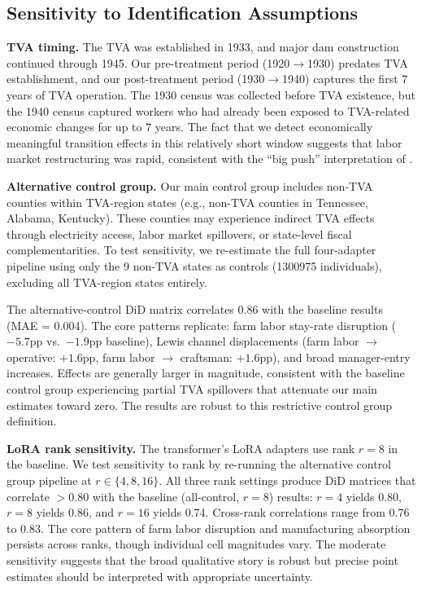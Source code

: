 \documentclass[12pt]{article}
\begin{document}
\subsection{Sensitivity to Identification Assumptions}

\textbf{TVA timing.} The TVA was established in 1933, and major dam construction continued through 1945. Our pre-treatment period (1920$\to$1930) predates TVA establishment, and our post-treatment period (1930$\to$1940) captures the first 7 years of TVA operation. The 1930 census was collected before TVA existence, but the 1940 census captured workers who had already been exposed to TVA-related economic changes for up to 7 years. The fact that we detect economically meaningful transition effects in this relatively short window suggests that labor market restructuring was rapid, consistent with the ``big push'' interpretation of \citet{kline2014}.

\textbf{Alternative control group.} Our main control group includes non-TVA counties within TVA-region states (e.g., non-TVA counties in Tennessee, Alabama, Kentucky). These counties may experience indirect TVA effects through electricity access, labor market spillovers, or state-level fiscal complementarities. To test sensitivity, we re-estimate the full four-adapter pipeline using only the 9 non-TVA states as controls (\num{1300975} individuals), excluding all TVA-region states entirely.

The alternative-control DiD matrix correlates 0.86 with the baseline results (MAE = 0.004). The core patterns replicate: farm labor stay-rate disruption ($-5.7$pp vs.\ $-1.9$pp baseline), Lewis channel displacements (farm labor $\to$ operative: $+1.6$pp, farm labor $\to$ craftsman: $+1.6$pp), and broad manager-entry increases. Effects are generally larger in magnitude, consistent with the baseline control group experiencing partial TVA spillovers that attenuate our main estimates toward zero. The results are robust to this restrictive control group definition.

\textbf{LoRA rank sensitivity.} The transformer's LoRA adapters use rank $r = 8$ in the baseline. We test sensitivity to rank by re-running the alternative control group pipeline at $r \in \{4, 8, 16\}$. All three rank settings produce DiD matrices that correlate $> 0.80$ with the baseline (all-control, $r = 8$) results: $r = 4$ yields 0.80, $r = 8$ yields 0.86, and $r = 16$ yields 0.74. Cross-rank correlations range from 0.76 to 0.83. The core pattern of farm labor disruption and manufacturing absorption persists across ranks, though individual cell magnitudes vary. The moderate sensitivity suggests that the broad qualitative story is robust but precise point estimates should be interpreted with appropriate uncertainty.
\end{document}
